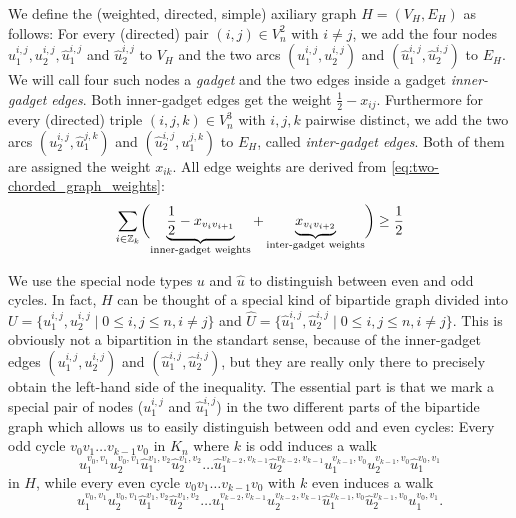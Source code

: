 We define the (weighted, directed, simple) axiliary graph $H = (V_{H}, E_{H})$ as follows:
For every (directed) pair $(i,j) \in V_{n}^{2}$ with $i \neq j$, we add the four nodes $u_{1}^{i,j}, u_{2}^{i,j}, \hat{u}_{1}^{i,j}$ and $\hat{u}_{2}^{i,j}$ to $V_{H}$ 
and the two arcs $(u_{1}^{i,j}, u_{2}^{i,j})$ and $(\hat{u}_{1}^{i,j}, \hat{u}_{2}^{i,j})$ to $E_{H}$.
We will call four such nodes a \textit{gadget} and the two edges inside a gadget \textit{inner-gadget edges}.
Both inner-gadget edges get the weight $\frac{1}{2} - x_{ij}$.
Furthermore for every (directed) triple $(i,j,k) \in V_{n}^{3}$ with $i,j,k$ pairwise distinct, we add the two arcs $(u_{2}^{i,j}, \hat{u}_{1}^{j,k})$ and $(\hat{u}_{2}^{i,j}, u_{1}^{j,k})$ to $E_{H}$, called \textit{inter-gadget edges}.
Both of them are assigned the weight $x_{ik}$.
All edge weights are derived from \cref{eq:two-chorded_graph_weights}:
\begin{equation*}
	\sum_{i \in \mathbb{Z}_k} \biggl( \underbrace{ \frac{1}{2} -x_{v_i v_{i+1}} }_{\text{inner-gadget weights}} + \underbrace{x_{v_i v_{i+2}}}_{\text{inter-gadget weights}} \biggr) \geq \frac{1}{2}
\end{equation*}

We use the special node types $u$ and $\hat{u}$ to distinguish between even and odd cycles.
In fact, $H$ can be thought of a special kind of bipartide graph divided into ${U = \big\{ u_{1}^{i,j}, u_{2}^{i,j} \mid 0 \leq i,j \leq n, i \neq j \big\}}$ and $\hat{U} = \big\{ \hat{u}_{1}^{i,j}, \hat{u}_{2}^{i,j} \mid 0 \leq i,j \leq n, i \neq j \big\}$.
This is obviously not a bipartition in the standart sense, because of the inner-gadget edges $(u_{1}^{i,j}, u_{2}^{i,j})$ and $(\hat{u}_{1}^{i,j}, \hat{u}_{2}^{i,j})$, but they are really only there to precisely obtain the left-hand side of the inequality.
The essential part is that we mark a special pair of nodes ($u_{1}^{i,j}$ and $\hat{u}_{1}^{i,j}$) in the two different parts of the bipartide graph which allows us to easily distinguish between odd and even cycles:
Every odd cycle $v_{0}v_{1} \ldots v_{k-1}v_{0}$ in $K_{n}$ where $k$ is odd induces a walk
\[
	u_{1}^{v_{0}, v_{1}}u_{2}^{v_{0}, v_{1}}\hat{u}_{1}^{v_{1}, v_{2}}\hat{u}_{2}^{v_{1}, v_{2}}
	\ldots
	\hat{u}_{1}^{v_{k-2}, v_{k-1}}\hat{u}_{2}^{v_{k-2}, v_{k-1}}u_{1}^{v_{k-1}, v_{0}}u_{2}^{v_{k-1}, v_{0}}\hat{u}_{1}^{v_{0}, v_{1}}
\]
in $H$, while every even cycle $v_{0}v_{1} \ldots v_{k-1}v_{0}$ with $k$ even induces a walk
\[
	u_{1}^{v_{0}, v_{1}}u_{2}^{v_{0}, v_{1}}\hat{u}_{1}^{v_{1}, v_{2}}\hat{u}_{2}^{v_{1}, v_{2}}
	\ldots
	u_{1}^{v_{k-2}, v_{k-1}}u_{2}^{v_{k-2}, v_{k-1}}\hat{u}_{1}^{v_{k-1}, v_{0}}\hat{u}_{2}^{v_{k-1}, v_{0}}u_{1}^{v_{0}, v_{1}}
.\]

